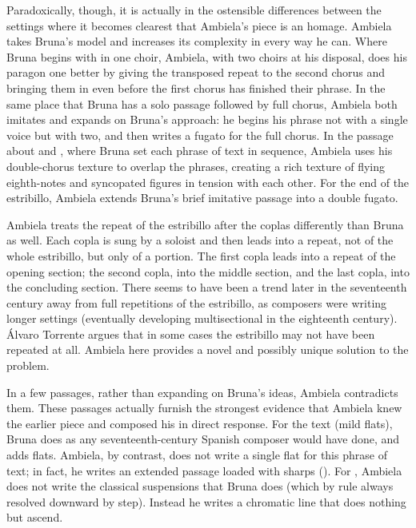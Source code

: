
Paradoxically, though, it is actually in the ostensible differences between the
settings where it becomes clearest that Ambiela's piece is an homage.
Ambiela takes Bruna's model and increases its complexity in every way he can.
Where Bruna begins with  in one choir, Ambiela, with two choirs
at his disposal, does his paragon one better by giving the transposed repeat to
the second chorus and bringing them in even before the first chorus has
finished their phrase.
In the same place that Bruna has a solo passage followed by full chorus,
Ambiela both imitates and expands on Bruna's approach: he begins his phrase not
with a single voice but with two, and then writes a fugato for the full chorus.
In the passage about  and , where Bruna set
each phrase of text in sequence, Ambiela uses his double-chorus texture to
overlap the phrases, creating a rich texture of flying eighth-notes and
syncopated figures in tension with each other.
For the end of the estribillo, Ambiela extends Bruna's brief imitative passage
into a double fugato.


Ambiela treats the repeat of the estribillo after the coplas differently than
Bruna as well.
Each copla is sung by a soloist and then leads into a repeat, not of the whole
estribillo, but only of a portion.
The first copla leads into a repeat of the opening section; the second copla,
into the middle section, and the last copla, into the concluding section.
There seems to have been a trend later in the seventeenth century away from
full repetitions of the estribillo, as composers were writing longer settings
(eventually developing multisectional  in the eighteenth
century).
Álvaro Torrente argues that in some cases the estribillo may not have been
repeated at all.%
    \Autocite{Torrente:Estribillo}
Ambiela here provides a novel and possibly unique solution to the problem.


In a few passages, rather than expanding on Bruna's ideas, Ambiela contradicts
them.
These passages actually furnish the strongest evidence that Ambiela knew the
earlier piece and composed his in direct response.
For the text  (mild flats), Bruna does as any
seventeenth-century Spanish composer would have done, and adds flats.
Ambiela, by contrast, does not write a single flat for this phrase of text; in
fact, he writes an extended passage loaded with sharps
().
For , Ambiela does not write the classical
suspensions that Bruna does (which by rule always resolved downward by step).
Instead he writes a chromatic line that does nothing but ascend.

